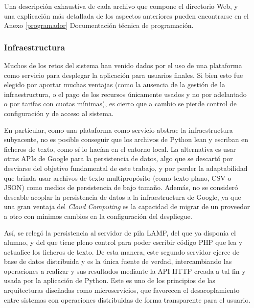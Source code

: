Una descripción exhaustiva de cada archivo que compone el directorio Web, y una explicación más detallada de los aspectos anteriores pueden encontrarse en el Anexo \ref{programador} \guillemotleft Documentación técnica de programación\guillemotright. 

\subsubsection{Infraestructura}

Muchos de los retos del sistema han venido dados por el uso de una plataforma como servicio para desplegar la aplicación para usuarios finales. Si bien esto fue elegido por aportar muchas ventajas (como la ausencia de la gestión de la infraestructura, o el pago de los recursos únicamente usados y no por adelantado o por tarifas con cuotas mínimas), es cierto que a cambio se pierde control de configuración y de acceso al sistema.

En particular, como una plataforma como servicio abstrae la infraestructura subyacente, no es posible conseguir que los archivos de Python lean y escriban en ficheros de texto, como sí lo hacían en el entorno local. La alternativa es usar otras APIs de Google para la persistencia de datos, algo que se descartó por desviarse del objetivo fundamental de este trabajo, y por perder la adaptabilidad que brinda usar archivos de texto multipropósito (como texto plano, CSV o JSON) como medios de persistencia de bajo tamaño. Además, no se consideró deseable acoplar la persistencia de datos a la infraestructura de Google, ya que una gran ventaja del \textit{Cloud Computing} es la capacidad de migrar de un proveedor a otro con mínimos cambios en la configuración del despliegue.

Así, se relegó la persistencia al servidor de pila LAMP, del que ya disponía el alumno, y del que tiene pleno control para poder escribir código PHP que lea y actualice los ficheros de texto. De esta manera, este segundo servidor ejerce de base de datos distribuida y es la única fuente de verdad, intercambiando las operaciones a realizar y sus resultados mediante la API HTTP creada a tal fin y usada por la aplicación de Python. Este es uno de los principios de las arquitecturas diseñadas como microservicios, que favorecen el desacoplamiento entre sistemas con operaciones distribuidas de forma transparente para el usuario.

